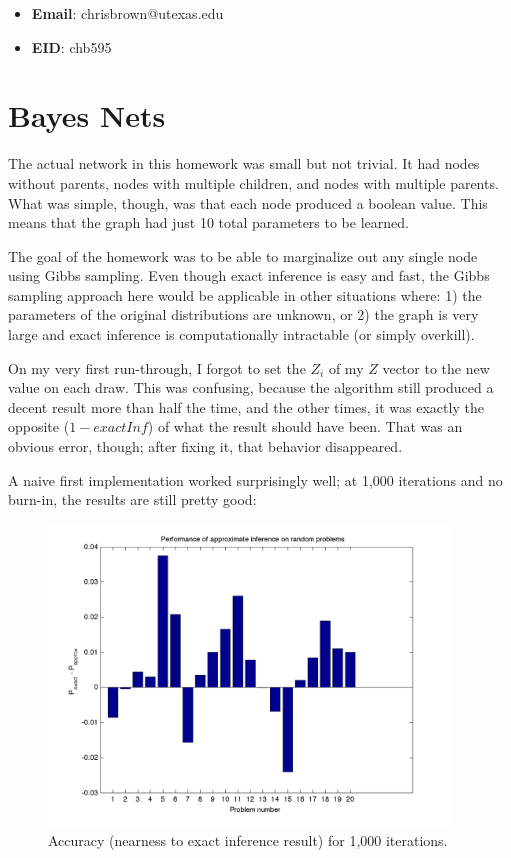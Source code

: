 \documentclass[11pt]{report}
\begin{document}
\begin{itemize}
  \item \textbf{Email}: chrisbrown@utexas.edu
  \item \textbf{EID}: chb595
\end{itemize}

\section{Bayes Nets}

The actual network in this homework was small but not trivial. It had nodes without parents, nodes with multiple children, and nodes with multiple parents. What was simple, though, was that each node produced a boolean value. This means that the graph had just 10 total parameters to be learned.

The goal of the homework was to be able to marginalize out any single node using Gibbs sampling. Even though exact inference is easy and fast, the Gibbs sampling approach here would be applicable in other situations where: 1) the parameters of the original distributions are unknown, or 2) the graph is very large and exact inference is computationally intractable (or simply overkill).

On my very first run-through, I forgot to set the $Z_i$ of my $Z$ vector to the new value on each draw. This was confusing, because the algorithm still produced a decent result more than half the time, and the other times, it was exactly the opposite ($1 - exactInf$) of what the result should have been. That was an obvious error, though; after fixing it, that behavior disappeared.

A naive first implementation worked surprisingly well; at 1,000 iterations and no burn-in, the results are still pretty good:

\begin{figure}[H]
  \centering
  \includegraphics[width=0.95\textwidth]{hw6-plot-n1000.png}
  \caption{Accuracy (nearness to exact inference result) for 1,000 iterations.}
  \label{fig:n1000}
\end{figure}
\end{document}
